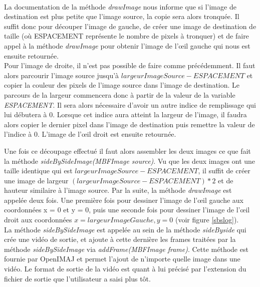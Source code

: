 \documentclass[10pt,a4paper]{article}
\begin{document}

~~\\

La documentation de la méthode \textit{drawImage} nous informe que si l'image de destination est plus petite que l'image source, la copie sera alors tronquée. Il suffit donc pour découper l'image de gauche, de créer une image de destination de taille  (où ESPACEMENT représente le nombre de pixels à tronquer) et de faire appel à la méthode \textit{drawImage} pour obtenir l'image de l'œil gauche qui nous est ensuite retournée.\\

Pour l'image de droite, il n'est pas possible de faire comme précédemment. Il faut alors parcourir l'image source jusqu'à $largeurImageSource - ESPACEMENT$ et copier la couleur des pixels de l'image source dans l'image de destination. Le parcours de la largeur commencera donc à partir de la valeur de la variable \textit{ESPACEMENT}. Il sera alors nécessaire d'avoir un autre indice de remplissage qui lui débutera à 0. Lorsque cet indice aura atteint la largeur de l'image, il faudra alors copier le dernier pixel dans l'image de destination puis remettre la valeur de l'indice à 0. L'image de l'œil droit est ensuite retournée.

Une fois ce découpage effectué il faut alors assembler les deux images ce que fait la méthode \textit{sideBySideImage(MBFImage source)}. Vu que les deux images ont une taille identique qui est $largeurImageSource - ESPACEMENT$, il suffit de créer une image de largeur $(largeurImageSource - ESPACEMENT) * 2$ et de hauteur similaire à l'image source. Par la suite, la méthode \textit{drawImage} est appelée deux fois. Une première fois pour dessiner l'image de l'œil gauche aux coordonnées x = 0 et y = 0, puis une seconde fois pour dessiner l'image de l'œil droit aux coordonnées $x = largeurImageGauche, y = 0$ (voir figure \ref{sbslog}).\\


La méthode \textit{sideBySideImage} est appelée au sein de la méthode \textit{sideByside} qui crée une vidéo de sortie, et ajoute à cette dernière les frames traitées par la méthode \textit{sideBySideImage} via \textit{addFrame(MBFImage frame)}. Cette méthode est fournie par OpenIMAJ et permet l'ajout de n'importe quelle image dans une vidéo. Le format de sortie de la vidéo est quant à lui précisé par l'extension du fichier de sortie que l'utilisateur a saisi plus tôt.
\end{document}
